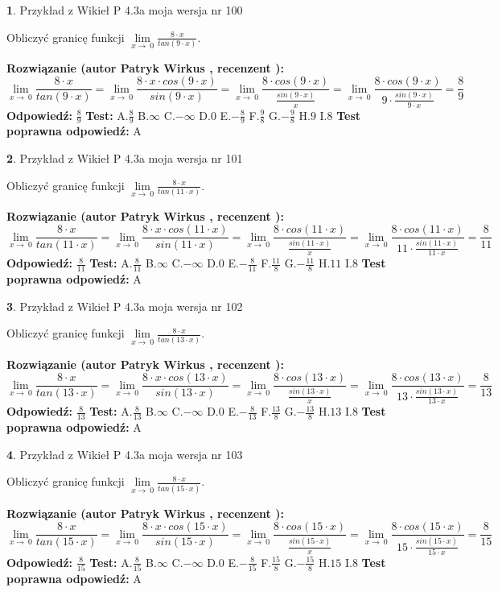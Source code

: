 \documentclass[12pt, a4paper]{article}
\theoremstyle{definition} %
\newtheorem{zad}{}
\newcommand{\zadStart}[1]{\begin{zad}#1\newline}
\newcommand{\zadStop}{\end{zad}}
\newcommand{\rozwStart}[2]{\noindent \textbf{Rozwiązanie (autor #1 , recenzent #2): }\newline}
\newcommand{\rozwStop}{\newline}
\newcommand{\odpStart}{\noindent \textbf{Odpowiedź:}\newline}
\newcommand{\odpStop}{\newline}
\newcommand{\testStart}{\noindent \textbf{Test:}\newline}
\newcommand{\testStop}{\newline}
\newcommand{\kluczStart}{\noindent \textbf{Test poprawna odpowiedź:}\newline}
\newcommand{\kluczStop}{\newline}
\begin{document}
\zadStart{Przykład z Wikieł P 4.3a moja wersja nr 100}


Obliczyć granicę funkcji $\lim\limits_{x\to\ 0}\frac{8 \cdot x}{tan(9 \cdot x)}$.
\zadStop
\rozwStart{Patryk Wirkus}{}
$$\lim\limits_{x\to\ 0}\frac{8 \cdot x}{tan(9 \cdot x)}=\lim\limits_{x\to\ 0}\frac{8 \cdot x \cdot cos(9 \cdot x)}{sin(9 \cdot x)}=\lim\limits_{x\to\ 0}\frac{8 \cdot cos(9 \cdot x)}{\frac{sin(9 \cdot x)}{x}}=\lim\limits_{x\to\ 0}\frac{8 \cdot cos(9 \cdot x)}{9 \cdot \frac{sin(9 \cdot x)}{9 \cdot x}} = \frac{8}{9}$$
\rozwStop
\odpStart
$\frac{8}{9}$
\odpStop
\testStart
A.$\frac{8}{9}$
B.$\infty$
C.$-\infty$
D.$0$
E.$-\frac{8}{9}$
F.$\frac{9}{8}$
G.$-\frac{9}{8}$
H.$9$
I.$8$
\testStop
\kluczStart
A
\kluczStop



\zadStart{Przykład z Wikieł P 4.3a moja wersja nr 101}


Obliczyć granicę funkcji $\lim\limits_{x\to\ 0}\frac{8 \cdot x}{tan(11 \cdot x)}$.
\zadStop
\rozwStart{Patryk Wirkus}{}
$$\lim\limits_{x\to\ 0}\frac{8 \cdot x}{tan(11 \cdot x)}=\lim\limits_{x\to\ 0}\frac{8 \cdot x \cdot cos(11 \cdot x)}{sin(11 \cdot x)}=\lim\limits_{x\to\ 0}\frac{8 \cdot cos(11 \cdot x)}{\frac{sin(11 \cdot x)}{x}}=\lim\limits_{x\to\ 0}\frac{8 \cdot cos(11 \cdot x)}{11 \cdot \frac{sin(11 \cdot x)}{11 \cdot x}} = \frac{8}{11}$$
\rozwStop
\odpStart
$\frac{8}{11}$
\odpStop
\testStart
A.$\frac{8}{11}$
B.$\infty$
C.$-\infty$
D.$0$
E.$-\frac{8}{11}$
F.$\frac{11}{8}$
G.$-\frac{11}{8}$
H.$11$
I.$8$
\testStop
\kluczStart
A
\kluczStop



\zadStart{Przykład z Wikieł P 4.3a moja wersja nr 102}


Obliczyć granicę funkcji $\lim\limits_{x\to\ 0}\frac{8 \cdot x}{tan(13 \cdot x)}$.
\zadStop
\rozwStart{Patryk Wirkus}{}
$$\lim\limits_{x\to\ 0}\frac{8 \cdot x}{tan(13 \cdot x)}=\lim\limits_{x\to\ 0}\frac{8 \cdot x \cdot cos(13 \cdot x)}{sin(13 \cdot x)}=\lim\limits_{x\to\ 0}\frac{8 \cdot cos(13 \cdot x)}{\frac{sin(13 \cdot x)}{x}}=\lim\limits_{x\to\ 0}\frac{8 \cdot cos(13 \cdot x)}{13 \cdot \frac{sin(13 \cdot x)}{13 \cdot x}} = \frac{8}{13}$$
\rozwStop
\odpStart
$\frac{8}{13}$
\odpStop
\testStart
A.$\frac{8}{13}$
B.$\infty$
C.$-\infty$
D.$0$
E.$-\frac{8}{13}$
F.$\frac{13}{8}$
G.$-\frac{13}{8}$
H.$13$
I.$8$
\testStop
\kluczStart
A
\kluczStop



\zadStart{Przykład z Wikieł P 4.3a moja wersja nr 103}


Obliczyć granicę funkcji $\lim\limits_{x\to\ 0}\frac{8 \cdot x}{tan(15 \cdot x)}$.
\zadStop
\rozwStart{Patryk Wirkus}{}
$$\lim\limits_{x\to\ 0}\frac{8 \cdot x}{tan(15 \cdot x)}=\lim\limits_{x\to\ 0}\frac{8 \cdot x \cdot cos(15 \cdot x)}{sin(15 \cdot x)}=\lim\limits_{x\to\ 0}\frac{8 \cdot cos(15 \cdot x)}{\frac{sin(15 \cdot x)}{x}}=\lim\limits_{x\to\ 0}\frac{8 \cdot cos(15 \cdot x)}{15 \cdot \frac{sin(15 \cdot x)}{15 \cdot x}} = \frac{8}{15}$$
\rozwStop
\odpStart
$\frac{8}{15}$
\odpStop
\testStart
A.$\frac{8}{15}$
B.$\infty$
C.$-\infty$
D.$0$
E.$-\frac{8}{15}$
F.$\frac{15}{8}$
G.$-\frac{15}{8}$
H.$15$
I.$8$
\testStop
\kluczStart
A
\kluczStop
\end{document}
